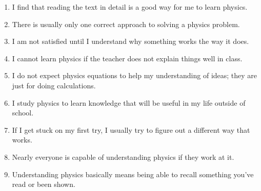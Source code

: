 \documentclass[addpoints,12pt]{exam}
\begin{document}
\begin{enumerate}
\item I find that reading the text in detail is a good way for me to learn physics.
\begin{center}\end{center}

\item There is usually only one correct approach to solving a physics problem.
\begin{center}\end{center}

\item I am not satisfied until I understand why something works the way it does.
\begin{center}\end{center}

\item I cannot learn physics if the teacher does not explain things well in class.
\begin{center}\end{center}

\item I do not expect physics equations to help my understanding of ideas; they are just for doing calculations.
\begin{center}\end{center}

\item I study physics to learn knowledge that will be useful in my life outside of school.
\begin{center}\end{center}

\item If I get stuck on my first try, I usually try to figure out a different way that works.
\begin{center}\end{center}

\item Nearly everyone is capable of understanding physics if they work at it.
\begin{center}\end{center}

\item Understanding physics basically means being able to recall something you've read or been shown.
\begin{center}\end{center}


\end{enumerate}
\end{document}
